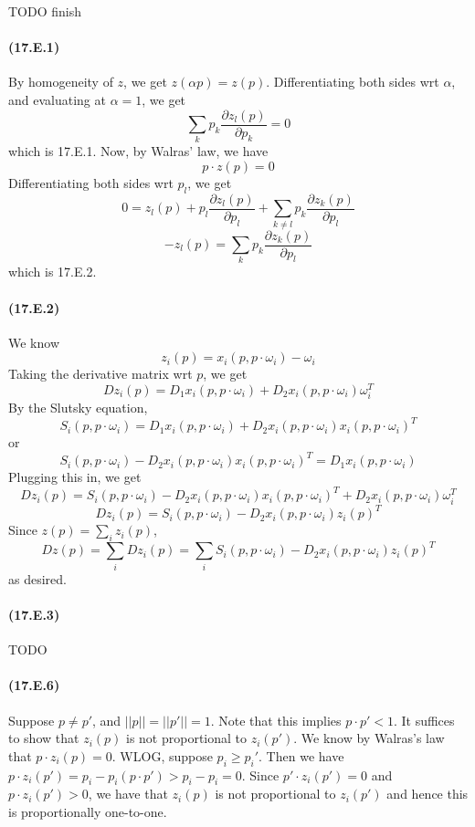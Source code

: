 \documentclass[10pt,letter]{article}
\begin{document}
TODO finish


\paragraph{(17.E.1)}
By homogeneity of $z$, we get $z(\alpha p ) = z(p)$. Differentiating both sides wrt $\alpha$, and evaluating at $\alpha = 1$, we get
\[ \sum_k p_k \frac{\partial z_l(p)}{\partial p_k} =  0 \]
which is 17.E.1. Now, by Walras' law, we have
\[ p \cdot z(p) = 0 \]
Differentiating both sides wrt $p_l$, we get
\[ 0 = z_l(p) + p_l \frac{\partial z_l(p)}{ \partial p_l} + \sum_{k\neq l} p_k \frac{\partial z_k(p)}{\partial p_l} \]
\[ -z_l(p) = \sum_{k} p_k \frac{\partial z_k(p)}{\partial p_l} \]
which is 17.E.2.
\paragraph{(17.E.2)}
We know
\[ z_i(p) = x_i(p, p\cdot \omega_i) - \omega_i \]
Taking the derivative matrix wrt $p$, we get
\[ Dz_i(p) = D_1x_i(p, p\cdot \omega_i) + D_2x_i(p, p\cdot \omega_i) \omega_i^T \]
By the Slutsky equation,
\[ S_i(p, p \cdot \omega_i) = D_1x_i(p, p\cdot \omega_i) + D_2 x_i(p, p\cdot\omega_i)x_i(p, p\cdot\omega_i)^T \]
or
\[ S_i(p, p \cdot \omega_i)-  D_2 x_i(p, p\cdot\omega_i)x_i(p, p\cdot\omega_i)^T = D_1x_i(p, p\cdot \omega_i) \]
Plugging this in, we get
\[ Dz_i(p) = S_i(p, p \cdot \omega_i) -  D_2 x_i(p, p\cdot\omega_i)x_i(p, p\cdot\omega_i)^T  + D_2x_i(p, p\cdot \omega_i) \omega_i^T \]
\[ Dz_i(p) = S_i(p, p \cdot \omega_i) -  D_2 x_i(p, p\cdot\omega_i)z_i(p)^T   \]
Since $z(p) = \sum_i z_i(p)$,
\[ Dz(p) = \sum_i Dz_i(p) = \sum_i S_i(p, p \cdot \omega_i) -  D_2 x_i(p, p\cdot\omega_i)z_i(p)^T  \]
as desired.
\paragraph{(17.E.3)}

TODO

\paragraph{(17.E.6)}

Suppose $p \neq p'$, and $||p|| = ||p'|| = 1$. Note that this implies $p \cdot p' < 1$. It suffices to show that $z_i(p)$ is not proportional to $z_i(p')$. We know by Walras's law that $p \cdot z_i(p) = 0$. WLOG, suppose $p_i \ge p_i'$. Then we have $p \cdot z_i(p') = p_i - p_i (p \cdot p') > p_i - p_i = 0$. Since $p' \cdot z_i(p') = 0$ and $p \cdot z_i(p') > 0$, we have that $z_i(p)$ is not proportional to $z_i(p')$ and hence this is proportionally one-to-one.
\end{document}
